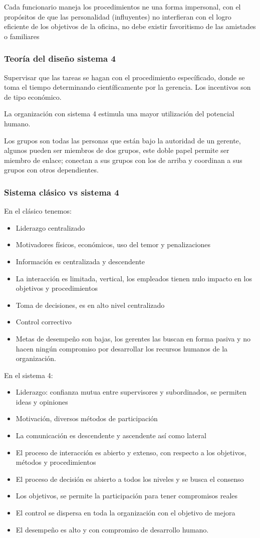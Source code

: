 Cada funcionario maneja los procedimientos ne una forma impersonal, con el propósitos de que las personalidad (influyentes) no interfieran con el logro eficiente de los objetivos de la oficina, no debe existir favoritismo de las amistades o familiares

\subsubsection{Teoría del diseño sistema 4}
Supervisar que las tareas se hagan con el procedimiento específicado, donde se toma el tiempo determinando científicamente por la gerencia. Los incentivos son de tipo económico.

La organización con sistema 4 estimula una mayor utilización del potencial humano.

Los grupos son todas las personas que están bajo la autoridad de un gerente, algunos pueden ser miembros de dos grupos, este doble papel permite ser miembro de enlace; conectan a sus grupos con los de arriba y coordinan a sus grupos con otros dependientes.

\subsubsection{Sistema clásico vs sistema 4}
En el clásico tenemos:
\begin{itemize}
    \item Liderazgo centralizado
    \item Motivadores físicos, económicos, uso del temor y penalizaciones
    \item Información es centralizada y descendente
    \item La interacción es limitada, vertical, los empleados tienen nulo impacto en los objetivos y procedimientos
    \item Toma de decisiones, es en alto nivel centralizado
    \item Control correctivo
    \item Metas de desempeño son bajas, los gerentes las buscan en forma pasiva y no hacen ningún compromiso por desarrollar los recursos humanos de la organización.
\end{itemize}
En el sistema 4:
\begin{itemize}
    \item Liderazgo: confianza mutua entre supervisores y subordinados, se permiten ideas y opiniones
    \item Motivación, diversos métodos de participación
    \item La comunicación es descendente y ascendente así como lateral
    \item El proceso de interacción es abierto y extenso, con respecto a los objetivos, métodos y procedimientos
    \item El proceso de decisión es abierto a todos los niveles y se busca el consenso
    \item Los objetivos, se permite la participación para tener compromisos reales
    \item El control se dispersa en toda la organización con el objetivo de mejora
    \item El desempeño es alto y con compromiso de desarrollo humano.
\end{itemize}
